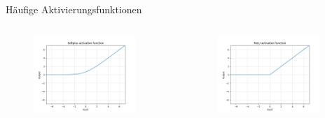 \documentclass[aspectratio=1610, xcolor=dvipsnames, 9pt]{beamer}
\begin{document}
      \begin{frame}{Häufige Aktivierungsfunktionen}
        \begin{columns}
          \begin{column}{0.5\textwidth}
            \begin{figure}
              \centering
                          \includegraphics[width=0.9\textwidth]{images/Softplus.png}
              \end{figure}
          \end{column}
           \begin{column}{0.5\textwidth}
             \begin{figure}
               \centering
                           \includegraphics[width=0.9\textwidth]{images/ReLU.png}
               \end{figure}
           \end{column}
        \end{columns}
      \end{frame}
\end{document}
